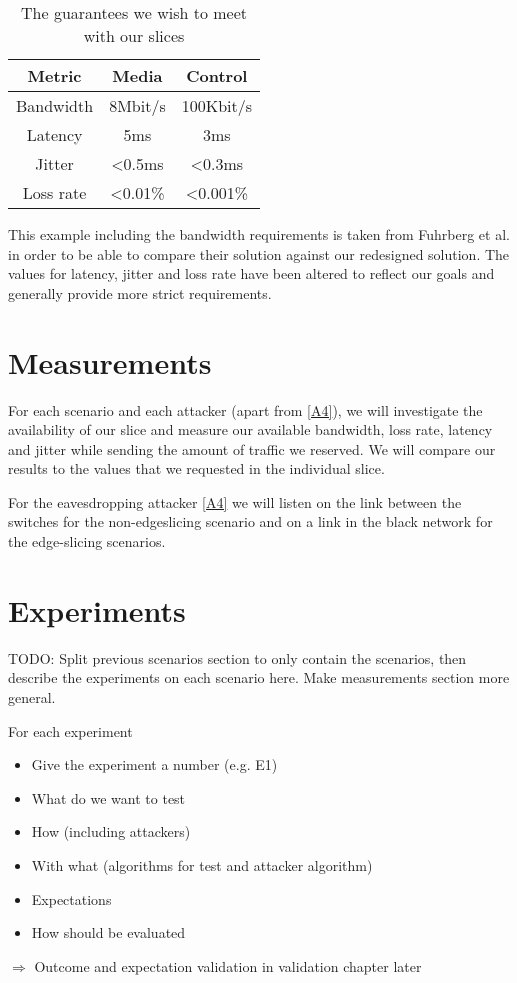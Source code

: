\begin{table}[ht]
    \centering
    \begin{tabular}{ |c|c|c| }
    \hline
    Metric & Media & Control \\
    \hline
         Bandwidth & 8Mbit/s & 100Kbit/s \\
         Latency   & 5ms     & 3ms      \\
         Jitter    & \textless 0.5ms  & \textless 0.3ms   \\
         Loss rate & \textless 0.01\% & \textless 0.001\% \\
    \hline
    \end{tabular}
    \caption{The guarantees we wish to meet with our slices}
    \label{table:1}
\end{table}

This example including the bandwidth requirements is taken from Fuhrberg et al. \cite{SE4} in order to be able to compare their solution against our redesigned solution. The values for latency, jitter and loss rate have been altered to reflect our goals and generally provide more strict requirements.


\section{Measurements}
For each scenario and each attacker (apart from \ref{A4}), we will investigate the availability of our slice and measure our available bandwidth, loss rate, latency and jitter while sending the amount of traffic we reserved. We will compare our results to the values that we requested in the individual slice.

For the eavesdropping attacker \ref{A4} we will listen on the link between the switches for the non-edgeslicing scenario and on a link in the black network for the edge-slicing scenarios.

\section{Experiments}
TODO: Split previous scenarios section to only contain the scenarios, then describe the experiments on each scenario here. Make measurements section more general.

For each experiment
\begin{itemize}
    \item Give the experiment a number (e.g. E1)
    \item What do we want to test
    \item How (including attackers)
    \item With what (algorithms for test and attacker algorithm)
    \item Expectations
    \item How should be evaluated
\end{itemize}
$\Rightarrow$ Outcome and expectation validation in validation chapter later
